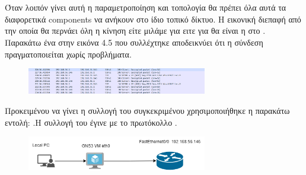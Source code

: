 \section{ }


Όταν λοιπόν γίνει αυτή η παραμετροποίηση και τοπολογία θα πρέπει όλα αυτά τα διαφορετικά components να ανήκουν στο ίδιο τοπικό δίκτυο.
Η εικονική διεπαφή από την οποία θα περνάει όλη η κίνηση είτε μιλάμε για  ειτε για  θα είναι η  στο . Παρακάτω ένα 
 στην εικόνα 4.5 που συλλέχτηκε αποδεικνύει ότι η σύνδεση πραγματοποιείται χωρίς προβλήματα.

\begin{figure}[htb]
	\centering
	\includegraphics[width=0.7\textwidth]{graphics/ssh_connection.png}
	\caption{ }
\end{figure}


Προκειμένου να γίνει η συλλογή του συγκεκριμένου  χρησιμοποιήθηκε η παρακάτω εντολή:
.Η συλλογή του  έγινε με το πρωτόκολλο .


\begin{figure}[htb]
	\centering
	\includegraphics[width=0.7\textwidth]{graphics/jason1.png}
	\caption{ }
\end{figure}